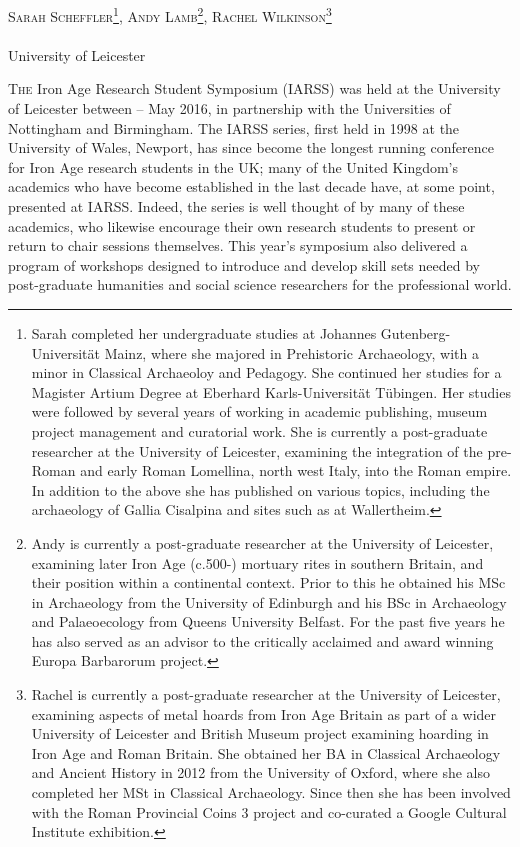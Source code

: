 \documentclass[ngerman,english]{ijsra}
\def\affiliation{University of Leicester}
\begin{document}
\IJSRAopening%
	{\Large\scshape
    Sarah Scheffler\footnote{Sarah  completed her undergraduate studies at Johannes Gutenberg-Universität Mainz, where she majored in Prehistoric Archaeology, with a minor in Classical Archaeoloy and Pedagogy. She continued her studies for a Magister Artium Degree at Eberhard Karls-Universität Tübingen. Her studies were followed by several years of working in academic publishing, museum project management and curatorial work. She is currently a post-graduate researcher at the University of Leicester, examining the integration of the pre-Roman and early Roman Lomellina, north west Italy, into the Roman empire. In addition to the above she has published on various topics, including the archaeology of Gallia Cisalpina and sites such as at Wallertheim.},
    Andy Lamb\footnote{Andy is currently a post-graduate researcher at the University of Leicester, examining later Iron Age (c.500\BC-) mortuary rites in southern Britain, and their position within a continental context. Prior to this he obtained his MSc in Archaeology from the University of Edinburgh and his BSc in Archaeology and Palaeoecology from Queens University Belfast. For the past five years he has also served as an advisor to the critically acclaimed and award winning Europa Barbarorum project.},
    Rachel Wilkinson\footnote{Rachel is currently a post-graduate researcher at the University of Leicester, examining aspects of metal hoards from Iron Age Britain as part of a wider University of Leicester and British Museum project examining hoarding in Iron Age and Roman Britain. She obtained her BA in Classical Archaeology and Ancient History in 2012 from the University of Oxford, where she also completed her MSt in Classical Archaeology.  Since then she has been involved with the Roman Provincial Coins 3 project and co-curated a Google Cultural Institute exhibition.}
}
	\\[1em]
	\email\\
	\affiliation
\IJSRAmid%





\begin{IJSRAabstract}

\end{IJSRAabstract}

\lettrine[nindent=0em,lines=3]{T}{he}  Iron Age Research Student Symposium (IARSS) was held at the University of Leicester between  -- May 2016, in partnership with the Universities of Nottingham and Birmingham. 
The IARSS series, first held in 1998 at the University of Wales, Newport, has since become the longest running conference for Iron Age research students in the UK; many of the United Kingdom’s academics who have become established in the last decade have, at some point, presented at IARSS. Indeed, the series is well thought of by many of these academics, who likewise encourage their own research students to present or return to chair sessions themselves. 
This year’s symposium also delivered a program of workshops designed to introduce and develop skill sets needed by post-graduate humanities and social science researchers for the professional world.
\end{document}
